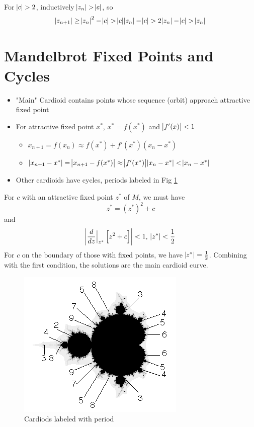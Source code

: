 \documentclass{article}
\begin{document}
For $\abs{c} > 2$, inductively $\abs{z_n} > \abs{c}$, so
\[ \abs{z_{n+1}} \geq \abs{z_n}^2 - \abs{c} > \abs{c}\abs{z_n} - \abs{c} > 2\abs{z_n} - \abs{c} > \abs{z_n} \] 


\section{Mandelbrot Fixed Points and Cycles}

\begin{itemize}
    \item "Main" Cardioid contains points whose sequence (orbit) approach attractive fixed point
    \item For attractive fixed point $x^*$, $x^* = f(x^*)$ and $\abs{f'(x)} < 1$
    \begin{itemize}
        \item $x_{n+1} = f(x_n) \approx f(x^*) + f'(x^*)(x_n - x^*)$
        \item $\abs{x_{n + 1} - x^*} = \abs{x_{n+1} - f(x^*)} \approx \abs{f'(x^*)}\abs{x_n - x^*} < \abs{x_n - x^*}$
    \end{itemize}
    \item Other cardioids have cycles, periods labeled in Fig \ref{fig:MandelbrotCycles}
\end{itemize}

For $c$ with an attractive fixed point $z^*$ of $M$, we must have
\[ z^* = (z^*)^2 + c \]
and
\[ \abs{\frac{d}{dz}\Bigr|_{z^*}\left[z^2 + c\right]} < 1,\ \abs{z^*} < \frac{1}{2} \]
For $c$ on the boundary of those with fixed points, we have $\abs{z^*} = \frac{1}{2}$. Combining with the first condition, the solutions are the main cardioid curve.



\begin{figure}[!htbp]
    \centering
    \includegraphics[width=.4\linewidth]{images/MandelMap1.png}
    \caption{Cardiods labeled with period \cite{MichaelFrame}} %
    \label{fig:MandelbrotCycles}
\end{figure}
\end{document}

